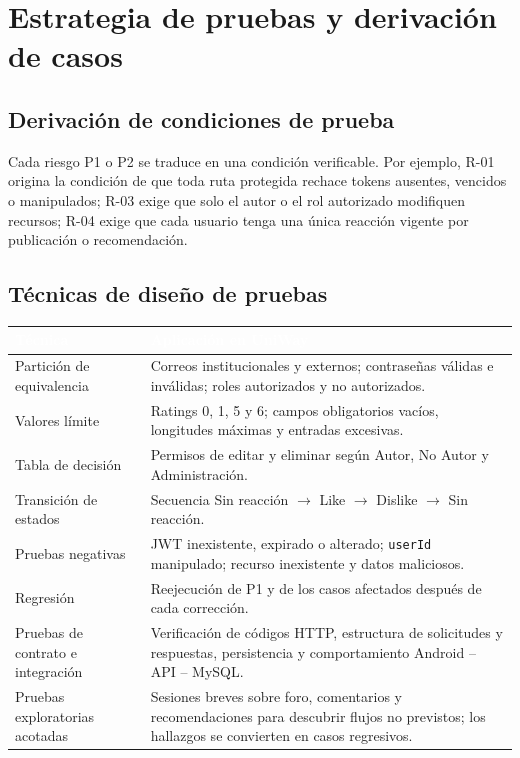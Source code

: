 \documentclass[11pt,a4paper]{article}
\newcommand{\thead}[1]{\textcolor{white}{\textbf{#1}}}
\begin{document}
\section{Estrategia de pruebas y derivación de casos}

\subsection{Derivación de condiciones de prueba}
Cada riesgo P1 o P2 se traduce en una condición verificable. Por ejemplo, R-01 origina la condición de que toda ruta protegida rechace tokens ausentes, vencidos o manipulados; R-03 exige que solo el autor o el rol autorizado modifiquen recursos; R-04 exige que cada usuario tenga una única reacción vigente por publicación o recomendación.

\subsection{Técnicas de diseño de pruebas}
\begin{tabularx}{\textwidth}{p{3.0cm}Y}
\thead{Técnica} & \thead{Aplicación en UniWay}\\
\midrule
Partición de equivalencia & Correos institucionales y externos; contraseñas válidas e inválidas; roles autorizados y no autorizados.\\
Valores límite & Ratings 0, 1, 5 y 6; campos obligatorios vacíos, longitudes máximas y entradas excesivas.\\
Tabla de decisión & Permisos de editar y eliminar según Autor, No Autor y Administración.\\
Transición de estados & Secuencia Sin reacción $\rightarrow$ Like $\rightarrow$ Dislike $\rightarrow$ Sin reacción.\\
Pruebas negativas & JWT inexistente, expirado o alterado; \texttt{userId} manipulado; recurso inexistente y datos maliciosos.\\
Regresión & Reejecución de P1 y de los casos afectados después de cada corrección.\\
Pruebas de contrato e integración & Verificación de códigos HTTP, estructura de solicitudes y respuestas, persistencia y comportamiento Android -- API -- MySQL.\\
Pruebas exploratorias acotadas & Sesiones breves sobre foro, comentarios y recomendaciones para descubrir flujos no previstos; los hallazgos se convierten en casos regresivos.\\
\end{tabularx}
\end{document}
